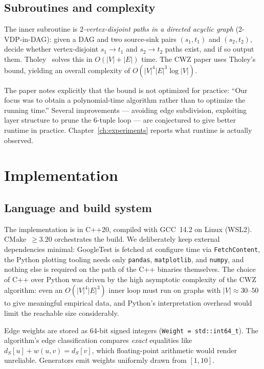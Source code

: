 \section{Subroutines and complexity}

The inner subroutine is \emph{$2$-vertex-disjoint paths in a directed acyclic
graph} (2-VDP-in-DAG): given a DAG and two source-sink pairs $(s_1,t_1)$ and
$(s_2,t_2)$, decide whether vertex-disjoint $s_1\to t_1$ and $s_2\to t_2$
paths exist, and if so output them. Tholey~\cite{Tholey2012} solves this in
$O(|V|+|E|)$ time. The CWZ paper uses Tholey's bound, yielding an overall
complexity of $O(|V|^{4}|E|^{3}\log|V|)$.

The paper notes explicitly that the bound is not optimized for practice:
``Our focus was to obtain a polynomial-time algorithm rather than to optimize
the running time.'' Several improvements --- avoiding edge subdivision,
exploiting layer structure to prune the $6$-tuple loop --- are conjectured
to give better runtime in practice. Chapter~\ref{ch:experiments} reports
what runtime is actually observed.

\chapter{Implementation}
\label{ch:implementation}

\section{Language and build system}

The implementation is in C++20, compiled with GCC~14.2 on Linux (WSL2).
CMake~$\ge 3.20$ orchestrates the build. We deliberately keep external
dependencies minimal: GoogleTest is fetched at configure time via
\texttt{FetchContent}, the Python plotting tooling needs only
\texttt{pandas}, \texttt{matplotlib}, and \texttt{numpy}, and nothing else
is required on the path of the C++ binaries themselves. The choice of C++
over Python was driven by the high asymptotic complexity of the CWZ
algorithm: even an $O(|V|^{4}|E|^{3})$ inner loop must run on graphs with
$|V|\approx 30$--$50$ to give meaningful empirical data, and Python's
interpretation overhead would limit the reachable size considerably.

Edge weights are stored as 64-bit signed integers (\texttt{Weight =
std::int64\_t}). The algorithm's edge classification compares
\textit{exact} equalities like $d_S[u]+w(u,v)=d_S[v]$, which floating-point
arithmetic would render unreliable. Generators emit weights uniformly drawn
from $[1, 10]$.

